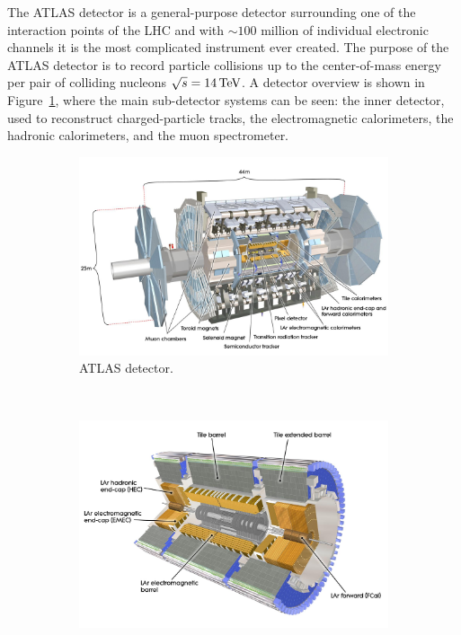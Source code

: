 The ATLAS detector \cite{ATLAS} is a general-purpose detector surrounding one of
the interaction points of the LHC and with $\sim 100$ million of individual
electronic channels it is the most complicated instrument ever created.
The purpose of the ATLAS detector is to record particle collisions up to the center-of-mass
energy per pair of colliding nucleons $\sqrt{s} = 14 \,\text{TeV}$. A detector overview is
shown in Figure~\ref{fig:ATLASfull}, where the main sub-detector systems can be
seen: the inner detector, used to reconstruct charged-particle tracks, the
electromagnetic calorimeters, the hadronic calorimeters, and the muon
spectrometer. 

\begin{figure}[p]
  \centering
  \begin{subfigure}[b]{0.9\textwidth}
    \includegraphics[width=\textwidth]{Chapter2/ATLAS.png}
    \caption{ATLAS detector.}
    \label{fig:ATLASfull}
  \end{subfigure}
  ~
  \begin{subfigure}[b]{0.9\textwidth}
    \includegraphics[width=\textwidth]{Chapter2/ATLASinner.jpeg}

\end{subfigure}
\end{figure}
